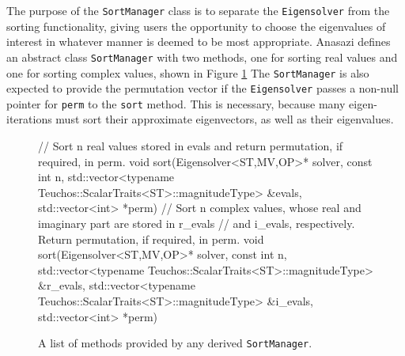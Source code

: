 \documentclass[acmtoms]{acmtrans2m}
\newcommand{\aspace}[1]{\texttt{#1}}
\begin{document}
The purpose of the \aspace{SortManager} class is to separate the \aspace{Eigensolver} from the sorting
functionality, giving users the opportunity to choose the eigenvalues of interest in whatever manner is
deemed to be most appropriate. Anasazi defines an abstract class \aspace{SortManager} with
two methods, one for sorting real values and one for sorting complex values, shown in Figure \ref{fig:sort}
The \aspace{SortManager} is also expected to provide the permutation vector if the 
\aspace{Eigensolver} passes a non-null pointer for \verb!perm! to the \aspace{sort} method.  This is 
necessary, because many eigen-iterations must sort their approximate eigenvectors, as well as their 
eigenvalues.
\begin{figure}[htb]
\begin{center}
\begin{boxedverbatim}
// Sort n real values stored in evals and return permutation, if required, in perm.
void sort(Eigensolver<ST,MV,OP>* solver, 
          const int n, 
          std::vector<typename Teuchos::ScalarTraits<ST>::magnitudeType> &evals,
          std::vector<int> *perm) 
// Sort n complex values, whose real and imaginary part are stored in r_evals 
//   and i_evals, respectively. Return permutation, if required, in perm.
void sort(Eigensolver<ST,MV,OP>* solver, 
          const int n, 
          std::vector<typename Teuchos::ScalarTraits<ST>::magnitudeType> &r_evals, 
          std::vector<typename Teuchos::ScalarTraits<ST>::magnitudeType> &i_evals, 
          std::vector<int> *perm)
\end{boxedverbatim}
\end{center}
\caption{A list of methods provided by any derived \aspace{SortManager}.} \label{fig:sort}
\end{figure}
\end{document}
